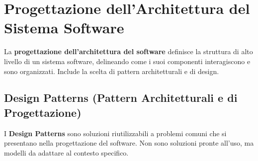 \section{Progettazione dell'Architettura del Sistema Software}
La \textbf{progettazione dell'architettura del software} definisce la struttura di alto livello di un sistema software, delineando come i suoi componenti interagiscono e sono organizzati. Include la scelta di pattern architetturali e di design.

\subsection{Design Patterns (Pattern Architetturali e di Progettazione)}
I \textbf{Design Patterns} sono soluzioni riutilizzabili a problemi comuni che si presentano nella progettazione del software. Non sono soluzioni pronte all'uso, ma modelli da adattare al contesto specifico.

